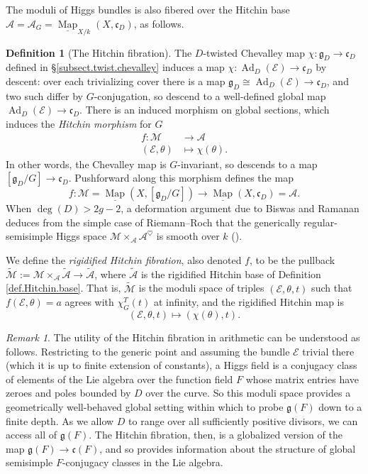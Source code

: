 \documentclass[openany]{amsbook}
\theoremstyle{definition}
\newtheorem{definition}[theorem]{Definition}
\theoremstyle{remark}
\newtheorem{remark}[theorem]{Remark}
\numberwithin{equation}{section}
\newcommand{\cA}{\mathcal{A}}
\newcommand{\cM}{\mathcal{M}}
\newcommand{\cE}{\mathcal{E}}
\newcommand{\ul}[1]{\underline{#1}}
\renewcommand{\-}{\operatorname{-}}
\newcommand{\Map}{\ul{\operatorname{Map}}}
\newcommand{\on}[1]{\operatorname{#1}}
\newcommand{\ctM}{\widetilde{\cM}}
\newcommand{\ctA}{\widetilde{\cA}}
\newcommand{\fc}{\mathfrak{c}}
\renewcommand{\fg}{\mathfrak{g}}
\newcommand{\Ad}{\on{Ad}}
\begin{document}
The moduli of Higgs bundles is also fibered over the Hitchin base $\cA = \cA_G = \Map_{X/k}(X, \fc_{D})$, as follows. 

\begin{definition}[The Hitchin fibration]\label{def.Hitchin.fib}
    The $D$-twisted Chevalley map $\chi : \fg_D \to \fc_D$ defined in \S \ref{subsect.twist.chevalley} induces a map $\chi : \Ad_D(\cE) \to \fc_D$ by descent: over each trivializing cover there is a map $\fg_D \cong \Ad_D(\cE) \to \fc_D$, and two such differ by $G$-conjugation, so descend to a well-defined global map $\Ad_D(\cE) \to \fc_D$. There is an induced morphism on global sections, which induces the \emph{Hitchin morphism} for $G$
    \begin{align*}
        f : \cM &\to \cA \\
            (\cE, \theta) &\mapsto \chi(\theta).
    \end{align*}
    In other words, the Chevalley map is $G$-invariant, so descends to a map $[\fg_D/G] \to \fc_D$. Pushforward along this morphism defines the map 
    $$
        f : \cM = \Map(X, [\fg_D/G]) \to \Map(X, \fc_D) = \cA.
    $$
    When $\deg(D) > 2g-2$, a deformation argument due to Biswas and Ramanan deduces from the simple case of Riemann--Roch that the generically regular-semisimple Higgs space $\cM \times_{\cA} \cA^{\heartsuit}$ is smooth over $k$ (\cite[Th\'eor\`eme 4.14.1]{ngofl}). 
    
    We define the \emph{rigidified Hitchin fibration}, also denoted $f$, to be the pullback $\ctM := \cM \times_{\cA} \ctA \to \ctA$, where $\ctA$ is the rigidified Hitchin base of Definition \ref{def.Hitchin.base}. That is, $\ctM$ is the moduli space of triples $(\cE, \theta, t)$ such that $f(\cE, \theta) = a$ agrees with $\chi^T_G(t)$ at infinity, and the rigidified Hitchin map is 
    $$
        (\cE, \theta, t) \mapsto (\chi(\theta), t).
    $$
\end{definition}

\begin{remark}
The utility of the Hitchin fibration in arithmetic can be understood as follows. Restricting to the generic point and assuming the bundle $\cE$ trivial there (which it is up to finite extension of constants), a Higgs field is a conjugacy class of elements of the Lie algebra over the function field $F$ whose matrix entries have zeroes and poles bounded by $D$ over the curve. So this moduli space provides a geometrically well-behaved global setting within which to probe $\fg(F)$ down to a finite depth. As we allow $D$ to range over all sufficiently positive divisors, we can access all of $\fg(F)$. The Hitchin fibration, then, is a globalized version of the map $\fg(F) \to \fc(F)$, and so provides information about the structure of global semisimple $F$-conjugacy classes in the Lie algebra.
\end{remark}
\end{document}
